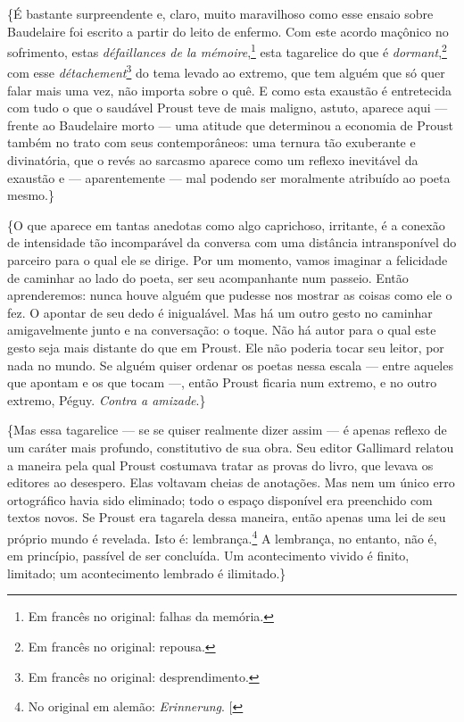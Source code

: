 \{É bastante surpreendente e, claro, muito maravilhoso como esse ensaio
sobre Baudelaire foi escrito a partir do leito de enfermo. Com este
acordo maçônico no sofrimento, estas \emph{défaillances de la mémoire},\footnote{Em francês no original: falhas da memória. \versal{[N. T.]}} esta
tagarelice do que é \emph{dormant},\footnote{Em francês no
  original: repousa. \versal{[N. T.]}} com esse \emph{détachement}\footnote{Em francês no original: desprendimento. \versal{[N. T.]}} do tema levado ao
extremo, que tem alguém que só quer falar mais uma vez, não importa
sobre o quê. E como esta exaustão é entretecida com tudo o que o
saudável Proust teve de mais maligno, astuto, aparece aqui --- frente ao
Baudelaire morto --- uma atitude que determinou a economia de Proust
também no trato com seus contemporâneos: uma ternura tão exuberante e
divinatória, que o revés ao sarcasmo aparece como um reflexo inevitável
da exaustão e --- aparentemente --- mal podendo ser moralmente atribuído ao poeta mesmo.\}

\{O que aparece em tantas anedotas como algo caprichoso, irritante, é a
conexão de intensidade tão incomparável da conversa com uma distância
intransponível do parceiro para o qual ele se dirige. Por um
momento, vamos imaginar a felicidade de caminhar ao lado do poeta, ser seu acompanhante num
passeio. Então aprenderemos: nunca houve alguém que pudesse nos
mostrar as coisas como ele o fez. O apontar de seu dedo é inigualável. Mas
há um outro gesto no caminhar amigavelmente junto e na conversação: o
toque. Não há autor para o qual este gesto seja mais distante do que em
Proust. Ele não poderia tocar seu leitor, por nada no mundo. Se alguém
quiser ordenar os poetas nessa escala --- entre aqueles que apontam e os
que tocam ---, então Proust ficaria num extremo, e no outro extremo,
Péguy. \emph{Contra a amizade}.\}

\{Mas essa tagarelice --- se se quiser realmente dizer assim --- é apenas
reflexo de um caráter mais profundo, constitutivo de sua obra. Seu
editor Gallimard relatou a maneira pela qual Proust costumava tratar
as provas do livro, que levava os editores ao desespero. Elas voltavam
cheias de anotações. Mas nem um único erro ortográfico havia sido
eliminado; todo o espaço disponível era preenchido com textos novos. Se
Proust era tagarela dessa maneira, então apenas uma lei de seu próprio
mundo é revelada. Isto é: lembrança.\footnote{No original em alemão: \emph{Erinnerung}. {[}\versal{N. T.}{]}} A lembrança, no entanto, não é, em
princípio, passível de ser concluída. Um acontecimento vivido é finito,
limitado; um acontecimento lembrado é ilimitado.\}

